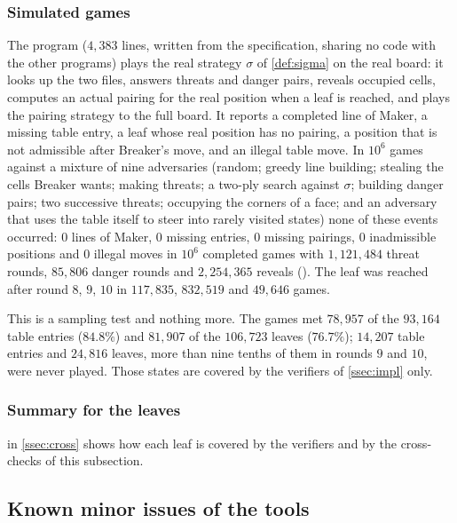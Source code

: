 \subsubsection*{Simulated games}
The program  ($4{,}383$ lines, written from the specification, sharing no code with the
other programs) plays the real strategy $\sigma$ of \cref{def:sigma} on the real board: it looks up the two
files, answers threats and danger pairs, reveals occupied cells, computes an actual pairing for the real
position when a leaf is reached, and plays the pairing strategy to the full board. It reports a completed
line of Maker, a missing table entry, a leaf whose real position has no pairing, a position that is not
admissible after Breaker's move, and an illegal table move. In $10^6$ games against a mixture of nine
adversaries (random; greedy line building; stealing the cells Breaker wants; making threats; a two-ply
search against $\sigma$; building danger pairs; two successive threats; occupying the corners of a face;
and an adversary that uses the table itself to steer into rarely visited states) none of these events
occurred: $0$ lines of Maker, $0$ missing entries, $0$ missing pairings, $0$ inadmissible positions and $0$
illegal moves in $10^6$ completed games with $1{,}121{,}484$ threat rounds, $85{,}806$ danger rounds and $2{,}254{,}365$ reveals
(). The leaf was reached after round $8$, $9$, $10$ in
$117{,}835$, $832{,}519$ and $49{,}646$ games.

This is a sampling test and nothing more. The games met $78{,}957$ of the $93{,}164$ table entries
($84.8\%$) and $81{,}907$ of the $106{,}723$ leaves ($76.7\%$); $14{,}207$ table entries and $24{,}816$
leaves, more than nine tenths of them in rounds $9$ and $10$, were never played. Those states are
covered by the verifiers of \cref{ssec:impl} only.

\subsubsection*{Summary for the leaves}
 in \cref{ssec:cross} shows how each leaf is covered by the verifiers and by the cross-checks of
this subsection.

\subsection{Known minor issues of the tools}\label{ssec:supp-issues}


